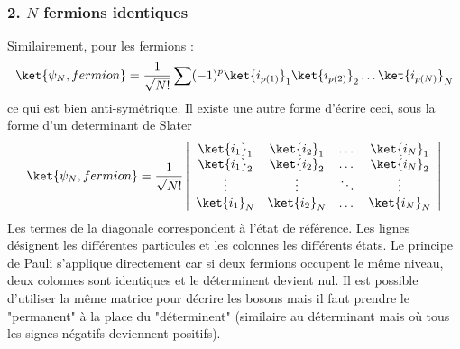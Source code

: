 \subsubsection{2. $N$ fermions identiques}
Similairement, pour les fermions :
\begin{equation}
\ket{\psi_N,fermion} = \frac{1}{\sqrt{N!}}\sum (-1)^p\ket{i_{p(1)}}_1\ket{i_{p(2)}}_2\dots\ket{i_{p(N)}}_N
\end{equation}
ce qui est bien anti-symétrique. Il existe une autre forme d'écrire ceci, sous la forme d'un determinant de Slater
\begin{equation}
\ket{\psi_N,fermion} = \frac{1}{\sqrt{N!}}\left|\begin{array}{cccc}
\ket{i_1}_1&\ket{i_2}_1&\dots&\ket{i_N}_1\\
\ket{i_1}_2&\ket{i_2}_2&\dots&\ket{i_N}_2\\
\vdots&\vdots&\ddots&\vdots\\
\ket{i_1}_N&\ket{i_2}_N&\dots&\ket{i_N}_N
\end{array}\right|
\end{equation}
Les termes de la diagonale correspondent à l'état de référence. Les lignes désignent les différentes particules et les 
colonnes les différents états. Le principe de Pauli s'applique directement car si deux fermions occupent le même niveau, 
deux colonnes sont identiques et le déterminent devient nul. Il est possible d'utiliser la même matrice pour décrire les 
bosons mais il faut prendre le "permanent" à la place du "déterminent" (similaire au déterminant mais où tous les signes 
négatifs deviennent positifs).

